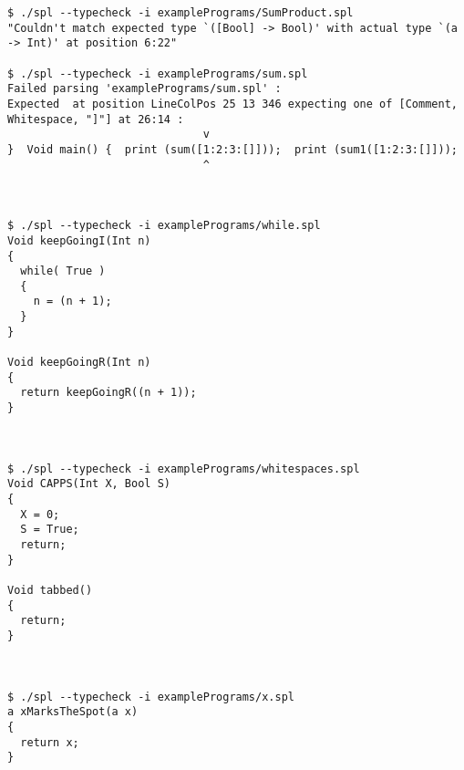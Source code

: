 \documentclass[a4paper]{article}
\begin{document}
\begin{verbatim}
$ ./spl --typecheck -i examplePrograms/SumProduct.spl
"Couldn't match expected type `([Bool] -> Bool)' with actual type `(a -> Int)' at position 6:22"

$ ./spl --typecheck -i examplePrograms/sum.spl
Failed parsing 'examplePrograms/sum.spl' :
Expected  at position LineColPos 25 13 346 expecting one of [Comment, Whitespace, "]"] at 26:14 :
                              v
}  Void main() {  print (sum([1:2:3:[]]));  print (sum1([1:2:3:[]]));  
                              ^



$ ./spl --typecheck -i examplePrograms/while.spl
Void keepGoingI(Int n)
{
  while( True )
  {
    n = (n + 1);
  }
}

Void keepGoingR(Int n)
{
  return keepGoingR((n + 1));
}



$ ./spl --typecheck -i examplePrograms/whitespaces.spl
Void CAPPS(Int X, Bool S)
{
  X = 0;
  S = True;
  return;
}

Void tabbed()
{
  return;
}



$ ./spl --typecheck -i examplePrograms/x.spl
a xMarksTheSpot(a x)
{
  return x;
}
\end{verbatim}



\end{document}
